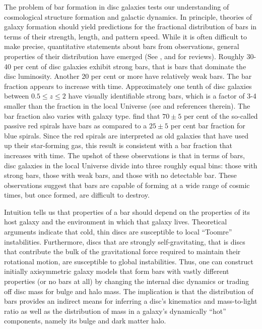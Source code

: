 The problem of bar formation in disc galaxies tests our understanding
of cosmological structure formation and galactic dynamics.  In
principle, theories of galaxy formation should yield predictions for
the fractional distribution of bars in terms of their strength,
length, and pattern speed.  While it is often difficult to make
precise, quantitative statements about bars from observations, general
properties of their distribution have emerged (See
\citet{sellwood1993}, \citet{Sellwood2013} and \citet{BT} for
reviews).  Roughly 30-40 per cent of disc galaxies exhibit strong
bars, that is bars that dominate the disc luminosity.  Another 20 per
cent or more have relatively weak bars.  The bar fraction appears to
increase with time.  Approximately one tenth of disc galaxies between
$0.5 \le z \le 2$ have visually identifiable strong bars, which is a
factor of 3-4 smaller than the fraction in the local Universe (see
\citet{simmons2014} and references therein).  The bar fraction also
varies with galaxy type.  \citet{masters2010} find that $70\pm 5$ per
cent of the so-called passive red spirals have bars as compared to a
$25\pm 5$ per cent bar fraction for blue spirals.  Since the red
spirals are interpreted as old galaxies that have used up their
star-forming gas, this result is consistent with a bar fraction that
increases with time.  The upshot of these observations is that in
terms of bars, disc galaxies in the local Universe divide into three
roughly equal bins: those with strong bars, those with weak bars, and
those with no detectable bar.  These observations suggest that bars are 
capable of forming at a wide range of cosmic times, but once formed,
are difficult to destroy.

Intuition tells us that properties of a bar should depend on the
properties of its host galaxy and the environment in which that
galaxy lives.  Theoretical arguments indicate that cold, thin discs
are susceptible to local ``Toomre'' instabilities.  Furthermore, discs
that are strongly self-gravitating, that is discs that contribute the
bulk of the gravitational force required to maintain their rotational
motion, are susceptible to global instabilities.  Thus, one can
construct initially axisymmetric galaxy models that form bars with
vastly different properties (or no bars at all) by changing the
internal disc dynamics or trading off disc mass for bulge and halo
mass.  The implication is that the distribution of bars provides an
indirect means for inferring a disc's kinematics and mass-to-light
ratio as well as the distribution of mass in a galaxy's dynamically
``hot'' components, namely its bulge and dark matter halo.

